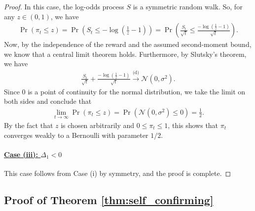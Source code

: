 \documentclass[12pt]{article}
\begin{document}
\begin{proof}
In this case, the log-odds process $S$ is a symmetric random walk.
So, for any $z \in (0,1)$, we have
\begin{align*}
    \Pr(\pi_t \leq z) = \Pr \left( S_t \leq - \log \left( \frac 1 z - 1 \right) \right) = \Pr \left( \frac{S_t}{\sqrt t} \leq \frac {- \log \left( \frac 1 z - 1 \right)} {\sqrt t} \right).
\end{align*}
Now, by the independence of the reward and the assumed second-moment bound, we know that a central limit theorem holds.
Furthermore, by Slutsky's theorem, we have
\begin{align*}
    \frac{S_t}{\sqrt t} + \frac {- \log \left( \frac 1 z - 1 \right)} {\sqrt t} \stackrel{\text{(d)}}{\longrightarrow} \mathcal N(0, \sigma^2).
\end{align*}
Since $0$ is a point of continuity for the normal distribution, we take the limit on both sides and conclude that
\begin{align*}
    \lim_{t \to \infty} \Pr(\pi_t \leq z) = \Pr(\mathcal N(0, \sigma^2) \leq 0) = \frac 1 2.
\end{align*}
By the fact that $z$ is chosen arbitrarily and $0 \leq \pi_t \leq 1$, this shows that $\pi_t$ converges weakly to a Bernoulli with parameter $1/2$.

\paragraph{\underline{Case (iii): $\Delta_1 < 0$}}

This case follows from Case (i) by symmetry, and the proof is complete. 

\end{proof}

\subsection{Proof of Theorem \ref{thm:self_confirming}}
\label{app:D:self_confirming_proof}
\end{document}
